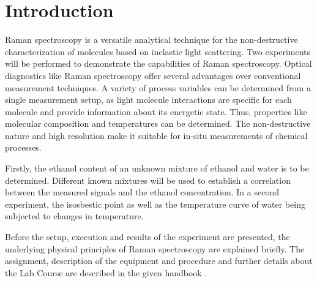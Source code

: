 
\chapter{Introduction}
\label{chap:intro}




Raman spectroscopy is a versatile analytical technique for the non-destructive characterization of molecules based on inelastic light scattering. Two experiments will be performed to demonstrate the capabilities of Raman spectroscopy.  Optical diagnostics like Raman spectroscopy offer several advantages over conventional measurement techniques. A variety of process variables can be determined from a single measurement setup, as light molecule interactions are specific for each molecule and provide information about its energetic state. Thus, properties like molecular composition and temperatures can be determined. The non-destructive nature and high resolution make it suitable for in-situ measurements of chemical processes. 

Firstly, the ethanol content of an unknown mixture of ethanol and water is to be determined. Different known mixtures will be used to establish a correlation between the measured signals and the ethanol concentration. In a second experiment, the isosbestic point as well as the temperature curve of water being subjected to changes in temperature.

Before the setup, execution and results of the experiment are presented, the underlying physical principles of Raman spectroscopy are explained briefly. The assignment, description of the equipment and procedure and further details about the Lab Course are described in the given handbook \autocite{brauerApplicationRamanSpectroscopy2022}.
